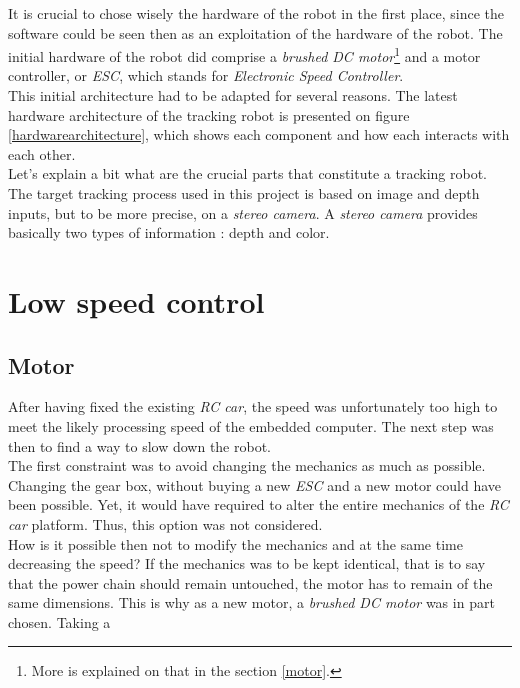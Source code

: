 		It is crucial to chose wisely the hardware of the robot in the first place, since
		the software could be seen then as an exploitation of the hardware of 
		the robot. The initial hardware of the robot did comprise
		a \textit{brushed DC motor}\footnote{More is explained 
		on that in the section \vref{motor}.} and a motor controller, or \textit{ESC}, which
		stands for \textit{ Electronic Speed Controller}.
		\\\indent This initial architecture had to be adapted for several reasons.
		The latest hardware architecture of the tracking robot is
		presented on figure \vref{hardwarearchitecture}, which
		shows each component and how each interacts with each other.
		\\\indent Let's explain a bit what are the crucial parts
		that constitute a tracking robot. The target tracking process used
		in this project is based on image and depth inputs, but to be more
		precise, on a \textit{stereo camera}. A \textit{stereo camera}
		provides basically two types of information : depth and color.
		
		\begin{figure}
			\label{hardwarearchitecture}
		\end{figure}

	\section{Low speed control}\label{motor}
	
		\subsection{Motor}
		
		After having fixed the existing \textit{RC car}, the speed was unfortunately 
		too high to meet the likely processing speed of the embedded computer.
		The next step
		was then to find a way to slow down the robot. 
		\\\indent The first constraint was to avoid changing the mechanics as much as
		possible. Changing the gear box, without buying a new \textit{ESC} and a new
		motor could have been possible. Yet, it would have required to alter 
		the entire mechanics of the \textit{RC car} platform. Thus, this option was 
		not considered.
		\\\indent How is it possible then not to modify the mechanics and
		at the same time decreasing the speed? If the mechanics was to 
		be kept identical, that is to say that the power chain should 
		remain untouched, the motor has to remain of the same dimensions.
		This is why as a new motor, a \textit{brushed DC motor} was in part 
		chosen. Taking a 
	
